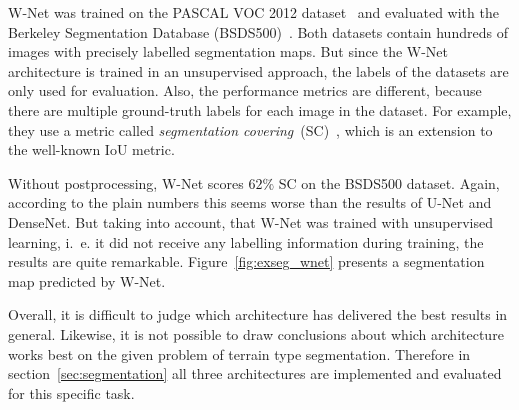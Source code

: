 W-Net was trained on the PASCAL VOC 2012 dataset~\cite{pascal_voc12} and evaluated with the Berkeley Segmentation Database (BSDS500)~\cite{hierarchy_imgseg11}. Both datasets contain hundreds of images with precisely labelled segmentation maps. But since the W-Net architecture is trained in an unsupervised approach, the labels of the datasets are only used for evaluation. Also, the performance metrics are different, because there are multiple ground-truth labels for each image in the dataset. For example, they use a metric called \emph{segmentation covering}~(SC)~\cite{hierarchy_imgseg11}, which is an extension to the well-known IoU metric.

Without postprocessing, W-Net scores $62\%$ SC on the BSDS500 dataset. Again, according to the plain numbers this seems worse than the results of U-Net and DenseNet. But taking into account, that W-Net was trained with unsupervised learning, i.~e. it did not receive any labelling information during training, the results are quite remarkable. Figure~\ref{fig:exseg_wnet} presents a segmentation map predicted by W-Net.

Overall, it is difficult to judge which architecture has delivered the best results in general. Likewise, it is not possible to draw conclusions about which architecture works best on the given problem of terrain type segmentation. Therefore in section~\ref{sec:segmentation} all three architectures are implemented and evaluated for this specific task.

\clearpage